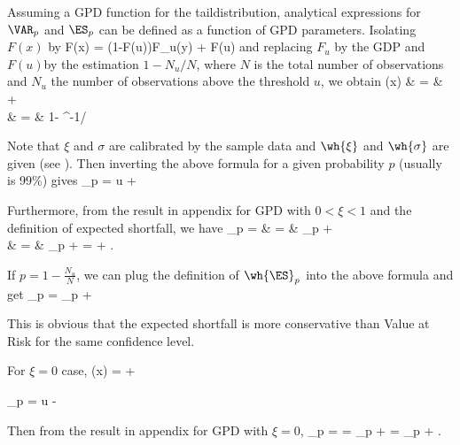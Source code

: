 Assuming a GPD function for the taildistribution, analytical expressions for $\VAR_p$ and $\ES_p$ can be defined as a function of GPD parameters. Isolating $F(x)$ by
\be
F(x) = (1-F(u))F_u(y) + F(u)
\ee
and replacing $F_u$ by the GDP and $F(u)$by the estimation $1-N_u/N$, where $N$ is the total number of observations and $N_u$ the number of observations above the threshold $u$, we obtain
\beast
{}(x) & = &   +  \\
& = &  1- ^{-1/\wh{\xi}}
\eeast

Note that $\xi$ and $\sigma$ are calibrated by the sample data and $\wh{\xi}$ and $\wh{\sigma}$ are given (see \cite{Gilli_Kellezi_2006}). Then inverting the above formula for a given probability $p$ (usually is 99\%) gives
\be
\wh{\VAR}_p = u + \frac{\wh{\xi}}{\wh{\sigma}}%
\ee

Furthermore, from the result in appendix for GPD with $0<\xi <1$ %
and the definition of expected shortfall, we have
\beast
\wh{\ES}_p = \E{} & = & %
\wh{\VAR}_p + \E{} \\%
& = & \wh{\VAR}_p +  =  + .
\eeast

If $p = 1- \frac {N_u}{N}$, we can plug the definition of $\wh{\ES}_p$ into the above formula and get
\be
\wh{\ES}_p = \wh{\VAR}_p + 
\ee

This is obvious that the expected shortfall is more conservative than Value at Risk for the same confidence level.

For $\xi = 0$ case,
\be
{}(x) =   + 
\ee

\be
\wh{\VAR}_p = u - \frac{\wh{\xi}}{\wh{\sigma}}\ln{}%
\ee

Then from the result in appendix for GPD with $\xi =0$,
\be
\wh{\ES}_p = \E{} = \wh{\VAR}_p + \E{} = \wh{\VAR}_p + \wh{\sigma}.
\ee